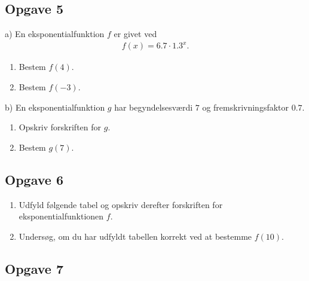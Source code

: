 \subsection*{Opgave 5}
a) En eksponentialfunktion $f$ er givet ved
\begin{align*}
	f(x) = 6.7\cdot 1.3^x.
\end{align*}
\begin{enumerate}[label=\roman*)]
	\item Bestem $f(4)$.
	\item Bestem $f(-3)$.
\end{enumerate}

b) En eksponentialfunktion $g$ har begyndelsesværdi $7$ og fremskrivningsfaktor $0.7$.
\begin{enumerate}[label=\roman*)]
	\item Opskriv forskriften for $g$. 
	\item Bestem $g(7)$. 
\end{enumerate}

\subsection*{Opgave 6}
\begin{enumerate}[label=\roman*)]
	\item Udfyld følgende tabel og opskriv derefter forskriften for eksponentialfunktionen $f$.
	\item Undersøg, om du har udfyldt tabellen korrekt ved at bestemme $f(10)$. 
\end{enumerate}

\begin{center}
\end{center}

\subsection*{Opgave 7}

